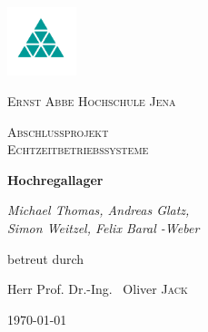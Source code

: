 \documentclass[a4paper, 12pt]{scrartcl}
\begin{document}
\begin{titlepage}
	\centering
	\includegraphics[width=0.15\textwidth]{diagrams/EAH.JPG}\par\vspace{1cm}
	{\scshape\LARGE Ernst Abbe Hochschule Jena\par}
	\vspace{1cm}
	{\scshape\Large Abschlussprojekt \\ Echtzeitbetriebssysteme\par}
	\vspace{1.5cm}
	{\huge\bfseries Hochregallager\par}
	\vspace{2cm}
	{\Large\itshape Michael Thomas, Andreas Glatz,\\ Simon Weitzel, Felix Baral -Weber \par}
	\vfill
	betreut durch\par
	Herr  Prof. Dr.-Ing. ~Oliver \textsc{Jack}

	\vfill

	{\large \today\par}
\end{titlepage}

\newpage %
\thispagestyle{empty} %
\newpage %

\tableofcontents
\pagebreak

\pagebreak

\pagebreak

\pagebreak

%
\end{document}
